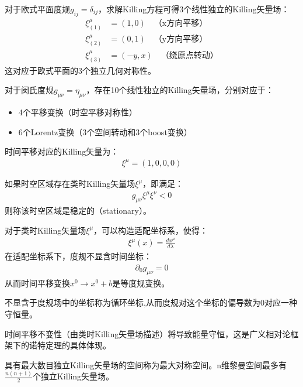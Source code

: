 \begin{example}[欧式平面的Killing矢量场]
对于欧式平面度规$g_{ij} = \delta_{ij}$，求解Killing方程可得3个线性独立的Killing矢量场：
\begin{align}
\xi_{(1)}^\mu &= (1,0) \quad \text{（x方向平移）} \\
\xi_{(2)}^\mu &= (0,1) \quad \text{（y方向平移）} \\
\xi_{(3)}^\mu &= (-y,x) \quad \text{（绕原点转动）}
\end{align}
这对应于欧式平面的3个独立几何对称性。
\end{example}

\begin{example}[闵可夫斯基时空的Killing矢量场]
对于闵氏度规$g_{\mu\nu} = \eta_{\mu\nu}$，存在10个线性独立的Killing矢量场，分别对应于：
\begin{itemize}
\item 4个平移变换（时空平移对称性）
\item 6个Lorentz变换（3个空间转动和3个boost变换）
\end{itemize}
时间平移对应的Killing矢量为：
\begin{align}
\xi^\mu = (1,0,0,0)
\end{align}
\end{example}

\begin{definition}[稳定时空]
如果时空区域存在类时Killing矢量场$\xi^\mu$，即满足：
\begin{align}
g_{\mu\nu}\xi^\mu\xi^\nu < 0
\end{align}
则称该时空区域是稳定的（stationary）。
\end{definition}

\begin{theorem}[适配坐标系与时间平移不变性]
对于类时Killing矢量场$\xi^\mu$，可以构造适配坐标系，使得：
\begin{align}
\xi^\mu(x) = \frac{dx^\mu}{d\lambda}
\end{align}
在适配坐标系下，度规不显含时间坐标：
\begin{align}
\partial_0 g_{\mu\nu} = 0
\end{align}
从而时间平移变换$x^0 \to x^0 + b$是等度规变换。
\end{theorem}

\begin{derivationnote}[适配坐标系的构造细节]
\end{derivationnote}



\begin{definition}[循环坐标与守恒量]
不显含于度规场中的坐标称为循环坐标,从而度规对这个坐标的偏导数为0对应一种守恒量。
\end{definition}
时间平移不变性（由类时Killing矢量场描述）将导致能量守恒，这是广义相对论框架下的诺特定理的具体体现。
\begin{definition}[最大对称空间]
具有最大数目独立Killing矢量场的空间称为最大对称空间。n维黎曼空间最多有$\frac{n(n+1)}{2}$个独立Killing矢量场。
\end{definition}


